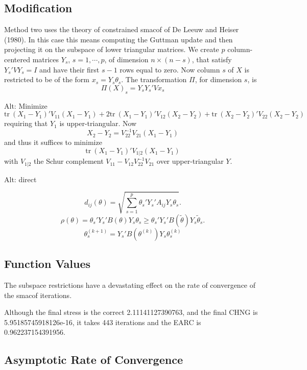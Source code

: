 \documentclass[
  12pt,
]{article}
\begin{document}
\subsection{Modification}\label{modification-2}

Method two uses the theory of constrained smacof of De Leeuw and Heiser (1980). In this case this means computing the Guttman update and then projecting it on the subspace of
lower triangular matrices. We create \(p\) column-centered matrices \(Y_s\), \(s=1,\cdots,p\), of dimension \(n\times(n-s)\), that satisfy \(Y_s'VY_s=I\) and have their first \(s-1\) rows equal to zero. Now column \(s\) of \(X\) is restricted to be of the form \(x_s=Y_s\theta_s\). The
transformation \(\Pi\), for dimension \(s\), is
\begin{equation}
\Pi(X)_s=Y_sY_s'Vx_s
\label{eq:subspace}
\end{equation}

Alt: Minimize
\[
\text{tr}\ (X_1-Y_1)'V_{11}(X_1-Y_1)+2\text{tr}\ (X_1-Y_1)'V_{12}(X_2-Y_2)+\text{tr}\ (X_2-Y_2)'V_{22}(X_2-Y_2)
\]
requiring that \(Y_1\) is upper-triangular. Now
\[
X_2-Y_2=V_{22}^{-1}V_{21}(X_1-Y_1)
\]
and thus it suffices to minimize
\[
\text{tr}\ (X_1-Y_1)'V_{1|2}(X_1-Y_1)
\]
with \(V_{1|2}\) the Schur complement \(V_{11}-V_{12}V_{22}^{-1}V_{21}\) over upper-triangular \(Y\).

Alt: direct

\[
d_{ij}(\theta)=\sqrt{\sum_{s=1}^p\theta_s'Y_s'A_{ij}Y_s\theta_s}.
\]
\[
\rho(\theta)=\theta_s'Y_s'B(\theta)Y_s\theta_s\geq\theta_s'Y_s'B(\tilde\theta)Y_s\tilde\theta_s.
\]
\[
\theta_s^{(k+1)}=Y_s'B(\theta^{(k)})Y_s\theta_s^{(k)}
\]

\subsection{Function Values}\label{function-values-3}

The subspace restrictions have a devastating effect on the rate of convergence of
the smacof iterations.

Although the final stress is the correct 2.11141127390763,
and the final CHNG is 5.95185745918126e-16, it takes
443 iterations and the EARC is 0.962237154391956.

\subsection{Asymptotic Rate of Convergence}\label{asymptotic-rate-of-convergence-3}
\end{document}

